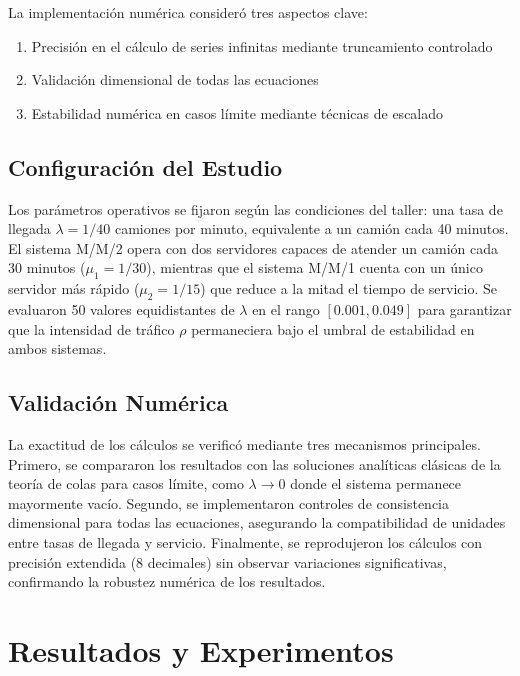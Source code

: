 \documentclass[12pt, a4paper]{article}
\begin{document}
    La implementación numérica consideró tres aspectos clave:
    \begin{enumerate}
    	\item Precisión en el cálculo de series infinitas mediante truncamiento controlado
    	\item Validación dimensional de todas las ecuaciones
    	\item Estabilidad numérica en casos límite mediante técnicas de escalado
    \end{enumerate}
    
    \subsection{Configuración del Estudio}
    Los parámetros operativos se fijaron según las condiciones del taller: una tasa de llegada $\lambda = 1/40$ camiones por minuto, equivalente a un camión cada 40 minutos. El sistema M/M/2 opera con dos servidores capaces de atender un camión cada 30 minutos ($\mu_1 = 1/30$), mientras que el sistema M/M/1 cuenta con un único servidor más rápido ($\mu_2 = 1/15$) que reduce a la mitad el tiempo de servicio. Se evaluaron 50 valores equidistantes de $\lambda$ en el rango $[0.001, 0.049]$ para garantizar que la intensidad de tráfico $\rho$ permaneciera bajo el umbral de estabilidad en ambos sistemas.
    
    \subsection{Validación Numérica}
    La exactitud de los cálculos se verificó mediante tres mecanismos principales. Primero, se compararon los resultados con las soluciones analíticas clásicas de la teoría de colas para casos límite, como $\lambda \to 0$ donde el sistema permanece mayormente vacío. Segundo, se implementaron controles de consistencia dimensional para todas las ecuaciones, asegurando la compatibilidad de unidades entre tasas de llegada y servicio. Finalmente, se reprodujeron los cálculos con precisión extendida (8 decimales) sin observar variaciones significativas, confirmando la robustez numérica de los resultados.
    
    \section{Resultados y Experimentos}
    
\end{document}

